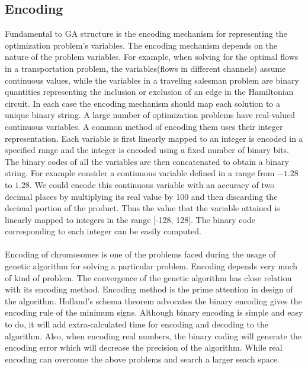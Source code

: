 \documentclass[a4paper, 12pt]{article}
\begin{document}
\subsection{Encoding}
Fundamental to GA structure is the encoding mechanism for representing the optimization problem's variables. The encoding mechanism depends on
the nature of the problem variables. For example, when solving for the optimal flows in a transportation problem, the variables(flows in 
different channels) assume continuous values, while the variables in a traveling salesman problem are binary quantities representing the 
inclusion or exclusion of an edge in the Hamiltonian circuit. In each case the encoding mechanism should map each solution to a unique binary
string. A large number of optimization problems have real-valued continuous variables. A common method of encoding them uses their integer 
representation. Each variable is first linearly mapped to an integer is encoded in a specified range and the integer is encoded using a fixed
number of binary bits. The binary codes of all the variables are then concatenated to obtain a binary string. For example consider a continuous
variable defined in a range from $-1.28$ to $1.28$. We could encode this continuous variable with an accuracy of two decimal places by 
multiplying its real value by 100 and then discarding the decimal portion of the product. Thus the value that the variable attained is linearly
mapped to integers in the range [-128, 128]. The binary code corresponding to each integer can be easily computed.\\~\\
\noindent
Encoding of chromosomes is one of the problems faced during the usage of genetic algorithm for solving a particular problem. Encoding depends very much of kind of problem. The convergence of the genetic algorithm has close relation with its encoding method. Encoding method is the prime
attention in design of the algorithm. Holland's schema theorem advocates the binary encoding gives the encoding rule of the minimum signs. 
Although binary encoding is simple and easy to do, it will add extra-calculated time for encoding and decoding to the algorithm. Also, when 
encoding real numbers, the binary coding will generate the encoding error which will decrease the precision of the algorithm. While real 
encoding can overcome the above problems and search a larger seach space.\\~\\
\end{document}
